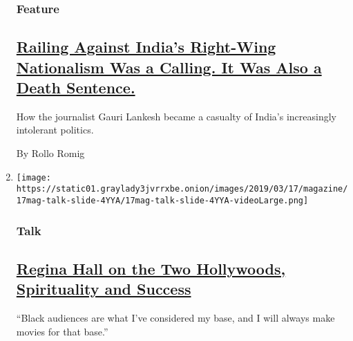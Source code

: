 \begin{enumerate}
{  \subsubsection{Feature}\label{feature-1}}

  \hypertarget{railing-against-indias-right-wing-nationalism-was-a-calling-it-was-also-a-death-sentence}{%
  \subsection{\texorpdfstring{\href{/2019/03/14/magazine/gauri-lankesh-murder-journalist.html}{Railing
  Against India's Right-Wing Nationalism Was a Calling. It Was Also a
  Death
  Sentence.}}{Railing Against India's Right-Wing Nationalism Was a Calling. It Was Also a Death Sentence.}}\label{railing-against-indias-right-wing-nationalism-was-a-calling-it-was-also-a-death-sentence}}

  How the journalist Gauri Lankesh became a casualty of India's
  increasingly intolerant politics.

  By Rollo Romig
\item
  \texttt{[image: https://static01.graylady3jvrrxbe.onion/images/2019/03/17/magazine/17mag-talk-slide-4YYA/17mag-talk-slide-4YYA-videoLarge.png]}

  \hypertarget{talk}{%
  \subsubsection{Talk}\label{talk}}

  \hypertarget{regina-hall-on-the-two-hollywoods-spirituality-and-success}{%
  \subsection{\texorpdfstring{\href{/interactive/2019/03/11/magazine/regina-hall-movies-black-audience.html}{Regina
  Hall on the Two Hollywoods, Spirituality and
  Success}}{Regina Hall on the Two Hollywoods, Spirituality and Success}}\label{regina-hall-on-the-two-hollywoods-spirituality-and-success}}

  ``Black audiences are what I've considered my base, and I will always
  make movies for that base.''
\end{enumerate}

